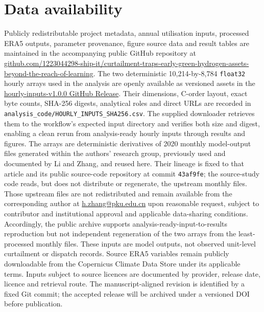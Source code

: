 \documentclass[11pt,a4paper]{article}
\begin{document}
\section*{Data availability}

Publicly redistributable project metadata, annual utilisation inputs, processed ERA5 outputs, parameter provenance, figure source data and result tables are maintained in the accompanying public GitHub repository at \href{https://github.com/1223044298-ship-it/curtailment-traps-early-green-hydrogen-assets-beyond-the-reach-of-learning}{github.com/1223044298-ship-it/curtailment-traps-early-green-hydrogen-assets-beyond-the-reach-of-learning}. The two deterministic 10,214-by-8,784 \texttt{float32} hourly arrays used in the analysis are openly available as versioned assets in the \href{https://github.com/1223044298-ship-it/curtailment-traps-early-green-hydrogen-assets-beyond-the-reach-of-learning/releases/tag/hourly-inputs-v1.0.0}{hourly-inputs-v1.0.0 GitHub Release}. Their dimensions, C-order layout, exact byte counts, SHA-256 digests, analytical roles and direct URLs are recorded in \texttt{analysis\_code/HOURLY\_INPUTS\_SHA256.csv}. The supplied downloader retrieves them to the workflow's expected input directory and verifies both size and digest, enabling a clean rerun from analysis-ready hourly inputs through results and figures. The arrays are deterministic derivatives of 2020 monthly model-output files generated within the authors' research group, previously used and documented by Li and Zhang\cite{li2026}, and reused here. Their lineage is fixed to that article and its public source-code repository at commit \texttt{43af9fe}; the source-study code reads, but does not distribute or regenerate, the upstream monthly files. Those upstream files are not redistributed and remain available from the corresponding author at \href{mailto:h.zhang@pku.edu.cn}{h.zhang@pku.edu.cn} upon reasonable request, subject to contributor and institutional approval and applicable data-sharing conditions. Accordingly, the public archive supports analysis-ready-input-to-results reproduction but not independent regeneration of the two arrays from the least-processed monthly files. These inputs are model outputs, not observed unit-level curtailment or dispatch records. Source ERA5 variables remain publicly downloadable from the Copernicus Climate Data Store under its applicable terms. Inputs subject to source licences are documented by provider, release date, licence and retrieval route. The manuscript-aligned revision is identified by a fixed Git commit; the accepted release will be archived under a versioned DOI before publication.
\end{document}
